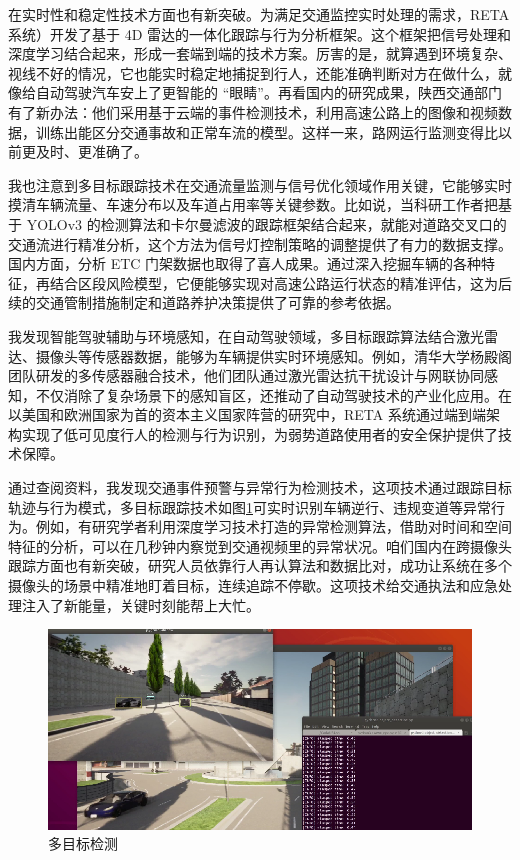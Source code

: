 在实时性和稳定性技术方面也有新突破。为满足交通监控实时处理的需求，RETA 系统\cite{zhang2023reta}）开发了基于 4D 雷达的一体化跟踪与行为分析框架。这个框架把信号处理和深度学习结合起来，形成一套端到端的技术方案。厉害的是，就算遇到环境复杂、视线不好的情况，它也能实时稳定地捕捉到行人，还能准确判断对方在做什么，就像给自动驾驶汽车安上了更智能的 “眼睛”。再看国内的研究成果，陕西交通部门有了新办法：他们采用基于云端的事件检测技术，利用高速公路上的图像和视频数据，训练出能区分交通事故和正常车流的模型。这样一来，路网运行监测变得比以前更及时、更准确了。


我也注意到多目标跟踪技术在交通流量监测与信号优化领域作用关键，它能够实时摸清车辆流量、车速分布以及车道占用率等关键参数。比如说，当科研工作者把基于 YOLOv3 的检测算法和卡尔曼滤波的跟踪框架结合起来，就能对道路交叉口的交通流进行精准分析，这个方法为信号灯控制策略的调整提供了有力的数据支撑。国内方面，分析 ETC 门架数据也取得了喜人成果。通过深入挖掘车辆的各种特征，再结合区段风险模型，它便能够实现对高速公路运行状态的精准评估，这为后续的交通管制措施制定和道路养护决策提供了可靠的参考依据。


我发现智能驾驶辅助与环境感知，在自动驾驶领域，多目标跟踪算法结合激光雷达、摄像头等传感器数据，能够为车辆提供实时环境感知。例如，清华大学杨殿阁团队\cite{tsinghua2023环境感知}研发的多传感器融合技术，他们团队通过激光雷达抗干扰设计与网联协同感知，不仅消除了复杂场景下的感知盲区，还推动了自动驾驶技术的产业化应用。在以美国和欧洲国家为首的资本主义国家阵营的研究中，RETA 系统通过端到端架构实现了低可见度行人的检测与行为识别，为弱势道路使用者的安全保护提供了技术保障。


通过查阅资料，我发现交通事件预警与异常行为检测技术，这项技术通过跟踪目标轨迹与行为模式，多目标跟踪技术如图\ref{fig:p24}可实时识别车辆逆行、违规变道等异常行为。例如，有研究学者利用深度学习技术打造的异常检测算法，借助对时间和空间特征的分析，可以在几秒钟内察觉到交通视频里的异常状况。咱们国内在跨摄像头跟踪方面也有新突破，研究人员依靠行人再认算法和数据比对，成功让系统在多个摄像头的场景中精准地盯着目标，连续追踪不停歇。这项技术给交通执法和应急处理注入了新能量，关键时刻能帮上大忙。


\begin{figure}[htbp] %
	\centering
	\includegraphics[width=1\textwidth]{p24} %
	\caption{多目标检测} %
	\label{fig:p24} %
\end{figure}


